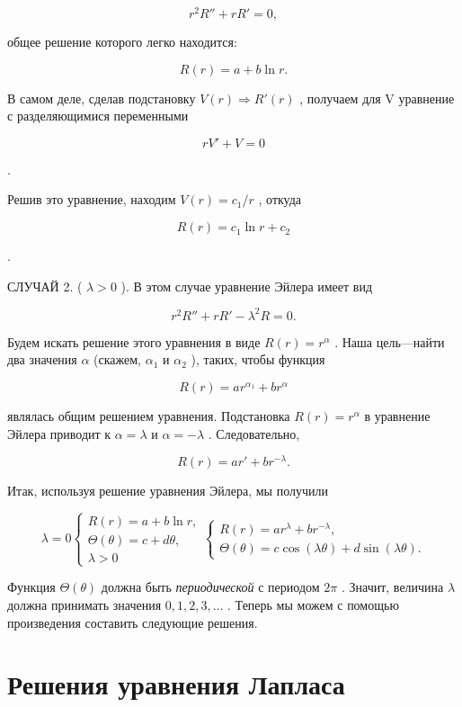 \documentclass[
  ukrainian,
]{article}
\begin{document}
\[
r^2R'' + rR' = 0,
\]

общее решение которого легко находится:

\[
R(r) = a + b \ln r.
\]

В самом деле, сделав подстановку
\(V\left(r\right) \Rightarrow R'\left(r\right)\) , получаем для V
уравнение с разделяющимися переменными

\[
rV' + V = 0
\]

.

Решив это уравнение, находим \(V\left(r\right)=c_{1}/r\) , откуда

\[
R(r) = c_1 \ln r + c_2
\]

.

СЛУЧАЙ 2. ( \(\lambda > 0\) ). В этом случае уравнение Эйлера имеет вид

\[
r^2R'' + rR' - \lambda^2R = 0.
\]

Будем искать решение этого уравнения в виде \(R(r)=r^{\alpha}\) . Наша
цель---найти два значения \(\alpha\) (скажем, \(\alpha_1\) и
\(\alpha_2\) ), таких, чтобы функция

\[
R(r) = ar^{\alpha_1} + br^{\alpha}
\]

являлась общим решением уравнения. Подстановка \(R(r) = r^{\alpha}\) в
уравнение Эйлера приводит к \(\alpha = \lambda\) и \(\alpha = -\lambda\)
. Следовательно,

\[
R(r) = ar' + br^{-\lambda}.
\]

Итак, используя решение уравнения Эйлера, мы получили

\[
\lambda = 0 \begin{cases} R(r) = a + b \ln r, \\ \Theta(\theta) = c + d\theta, \\ \lambda > 0 \end{cases}
\begin{cases} R(r) = ar^{\lambda} + br^{-\lambda}, \\ \Theta(\theta) = c \cos(\lambda \theta) + d \sin(\lambda \theta). \end{cases}
\]

Функция \(\Theta(\theta)\) должна быть \emph{периодической} с периодом
\(2\pi\) . Значит, величина \(\lambda\) должна принимать значения
\(0, 1, 2, 3, \ldots\) . Теперь мы можем с помощью произведения
составить следующие решения.

\section{Решения уравнения
Лапласа}\label{ux440ux435ux448ux435ux43dux438ux44f-ux443ux440ux430ux432ux43dux435ux43dux438ux44f-ux43bux430ux43fux43bux430ux441ux430}
\end{document}

